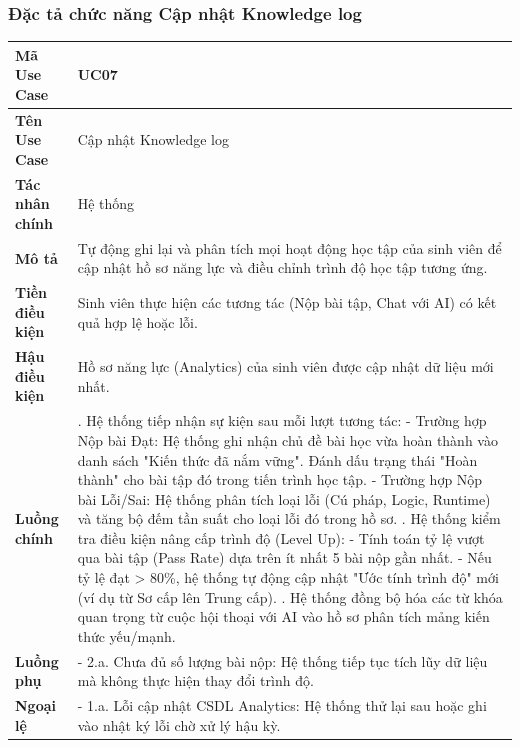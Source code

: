 \documentclass[../main.tex]{subfiles}
\begin{document}
\subsubsection{Đặc tả chức năng Cập nhật Knowledge log}


{
\renewcommand{\arraystretch}{1.5}
\begin{tabularx}{\textwidth}{|p{3.5cm}|>{\raggedright\arraybackslash}X|}
\caption{Bảng đặc tả chức năng Cập nhật Knowledge log}
\label{tab:bang-dac-ta-chuc-nang-cap-nhat-knowledge-log}
\\
\hline
\textbf{Mã Use Case} & UC07 \\
\hline
\textbf{Tên Use Case} & Cập nhật Knowledge log \\
\hline
\textbf{Tác nhân chính} & Hệ thống \\
\hline
\textbf{Mô tả} & Tự động ghi lại và phân tích mọi hoạt động học tập của sinh viên để cập nhật hồ sơ năng lực và điều chỉnh trình độ học tập tương ứng. \\
\hline
\textbf{Tiền điều kiện} & Sinh viên thực hiện các tương tác (Nộp bài tập, Chat với AI) có kết quả hợp lệ hoặc lỗi. \\
\hline
\textbf{Hậu điều kiện} & Hồ sơ năng lực (Analytics) của sinh viên được cập nhật dữ liệu mới nhất. \\
\hline
\textbf{Luồng chính} & 1. Hệ thống tiếp nhận sự kiện sau mỗi lượt tương tác: \newline - Trường hợp Nộp bài Đạt: \newline \+ Hệ thống ghi nhận chủ đề bài học vừa hoàn thành vào danh sách "Kiến thức đã nắm vững". \newline \+ Đánh dấu trạng thái "Hoàn thành" cho bài tập đó trong tiến trình học tập. \newline - Trường hợp Nộp bài Lỗi/Sai: \newline \+ Hệ thống phân tích loại lỗi (Cú pháp, Logic, Runtime) và tăng bộ đếm tần suất cho loại lỗi đó trong hồ sơ. \newline 2. Hệ thống kiểm tra điều kiện nâng cấp trình độ (Level Up): \newline - Tính toán tỷ lệ vượt qua bài tập (Pass Rate) dựa trên ít nhất 5 bài nộp gần nhất. \newline - Nếu tỷ lệ đạt > 80\%, hệ thống tự động cập nhật "Ước tính trình độ" mới (ví dụ từ Sơ cấp lên Trung cấp). \newline 3. Hệ thống đồng bộ hóa các từ khóa quan trọng từ cuộc hội thoại với AI vào hồ sơ phân tích mảng kiến thức yếu/mạnh. \\
\hline
\textbf{Luồng phụ} & - 2.a. Chưa đủ số lượng bài nộp: Hệ thống tiếp tục tích lũy dữ liệu mà không thực hiện thay đổi trình độ. \\
\hline
\textbf{Ngoại lệ} & - 1.a. Lỗi cập nhật CSDL Analytics: Hệ thống thử lại sau hoặc ghi vào nhật ký lỗi chờ xử lý hậu kỳ. \\
\hline
\end{tabularx}
}
\end{document}
